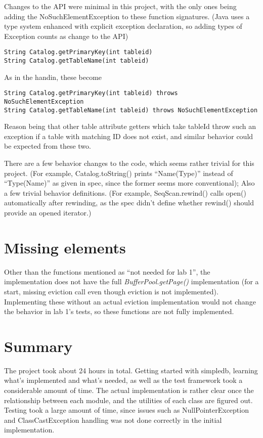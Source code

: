 \documentclass[11pt]{article}
\begin{document}
Changes to the API were minimal in this project, with the only ones being adding the NoSuchElementException to these function signatures. (Java uses a type system enhanced with explicit exception declaration, so adding types of Exception counts as change to the API)

\begin{lstlisting}
String Catalog.getPrimaryKey(int tableid) 
String Catalog.getTableName(int tableid) 
\end{lstlisting}
As in the handin, these become
\begin{lstlisting}
String Catalog.getPrimaryKey(int tableid) throws NoSuchElementException
String Catalog.getTableName(int tableid) throws NoSuchElementException
\end{lstlisting}

Reason being that other table attribute getters which take tableId throw such an exception if a table with matching ID does not exist, and similar behavior could be expected from these two.

There are a few behavior changes to the code, which seems rather trivial for this project. (For example, Catalog.toString() prints ``Name(Type)'' instead of ``Type(Name)'' as given in spec, since the former seems more conventional); Also a few trivial behavior definitions. (For example, SeqScan.rewind() calls open() automatically after rewinding, as the spec didn't define whether rewind() should provide an opened iterator.)

\section{Missing elements}

Other than the functions mentioned as ``not needed for lab 1'', the implementation does not have the full \textit{BufferPool.getPage()} implementation (for a start, missing eviction call even though eviction is not implemented). Implementing these without an actual eviction implementation would not change the behavior in lab 1's tests, so these functions are not fully implemented.

\section{Summary}

The project took about 24 hours in total. Getting started with simpledb, learning what's implemented and what's needed, as well as the test framework took a considerable amount of time. The actual implementation is rather clear once the relationship between each module, and the utilities of each class are figured out. Testing took a large amount of time, since issues such as NullPointerException and ClassCastException handling was not done correctly in the initial implementation.
\end{document}
